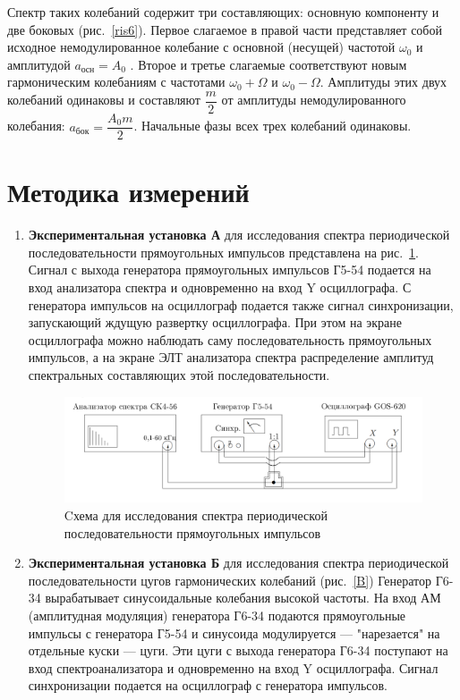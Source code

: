 \documentclass[a4paper, 12pt]{article}
\begin{document}
Спектр таких колебаний содержит три составляющих: основную компоненту и две боковых (рис.~\ref{ris6}). Первое слагаемое в правой части представляет собой исходное немодулированное колебание с основной (несущей) частотой $\omega_{0}$ и амплитудой $a_{осн} = A_{0}$ . Второе и третье слагаемые соответствуют новым гармоническим колебаниям с частотами $\omega_{0} + \Omega$ и $\omega_{0} - \Omega$. Амплитуды этих двух колебаний одинаковы и составляют $\dfrac{m}{2}$ от амплитуды немодулированного колебания:
$a_{бок} = \dfrac{A_{0}m}{2}$. Начальные фазы всех трех колебаний одинаковы.

\section{Методика измерений}
	
\begin{enumerate}
		
\item \textbf{Экспериментальная установка А} для исследования спектра периодической последовательности прямоугольных импульсов представлена на рис.~\ref{A}. Сигнал с выхода генератора прямоугольных импульсов Г5-54 подается на вход анализатора спектра и одновременно  на вход Y осциллографа. С генератора импульсов на осциллограф подается также сигнал синхронизации, запускающий ждущую развертку осциллографа. При этом на экране осциллографа можно наблюдать саму последовательность прямоугольных импульсов, а на экране ЭЛТ анализатора спектра  распределение амплитуд спектральных составляющих этой последовательности.
					
\begin{figure}[h!]
	\centering
	\includegraphics[width=\linewidth]{sp7.png}
	\caption{Cхема для исследования спектра периодической последовательности прямоугольных импульсов}
	\label{A}
\end{figure}
			
\item \textbf{Экспериментальная установка Б} для исследования спектра периодической последовательности цугов гармонических колебаний (рис.~\ref{B}) Генератор Г6-34 вырабатывает синусоидальные колебания высокой частоты. На вход АМ (амплитудная модуляция) генератора Г6-34 подаются прямоугольные импульсы с генератора Г5-54 и синусоида модулируется --- "нарезается" на отдельные куски --- цуги. Эти цуги с выхода генератора Г6-34 поступают на вход спектроанализатора и одновременно на вход Y осциллографа. Сигнал синхронизации подается на осциллограф с генератора импульсов.
		

\end{enumerate}
\end{document}

